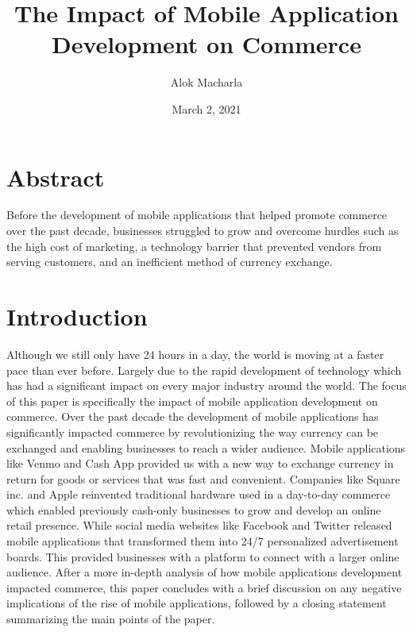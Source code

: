 \documentclass{article}
\title{The Impact of Mobile Application Development on Commerce}
\author{Alok Macharla }
\date{March 2, 2021}
\begin{document}
\maketitle

\section{Abstract}
Before the development of mobile applications that helped promote commerce over the past decade, businesses struggled to grow and overcome hurdles such as the high cost of marketing, a technology barrier that prevented vendors from serving customers, and an inefficient method of currency exchange.

\section{Introduction}
Although we still only have 24 hours in a day, the world is moving at a faster pace than ever before. Largely due to the rapid development of technology which has had a significant impact on every major industry around the world. The focus of this paper is specifically the impact of mobile application development on commerce. Over the past decade the development of mobile applications has significantly impacted commerce by revolutionizing the way currency can be exchanged and enabling businesses to reach a wider audience. Mobile applications like Venmo and Cash App provided us with a new way to exchange currency in return for goods or services that was fast and convenient. Companies like Square inc. and Apple reinvented traditional hardware used in a day-to-day commerce which enabled previously cash-only businesses to grow and develop an online retail presence. While social media websites like Facebook and Twitter released mobile applications that transformed them into 24/7 personalized advertisement boards. This provided businesses with a platform to connect with a larger online audience. After a more in-depth analysis of how mobile applications development impacted commerce, this paper concludes with a brief discussion on any negative implications of the rise of mobile applications, followed by a closing statement summarizing the main points of the paper.
\end{document}
